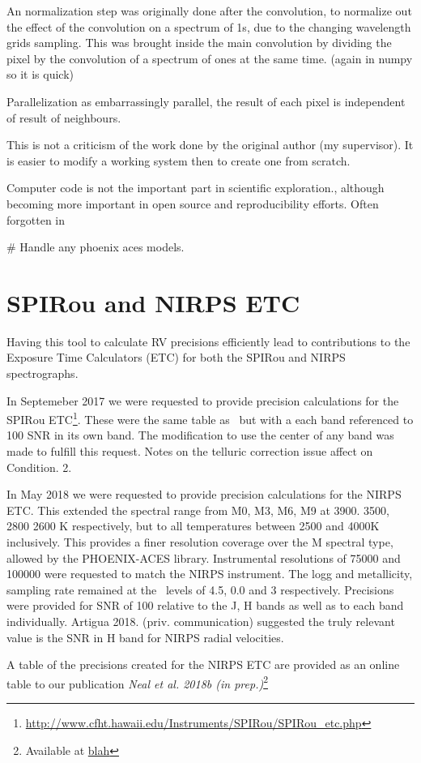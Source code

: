 An normalization step was originally done after the convolution, to normalize out the effect of the convolution on a spectrum of 1s, due to the changing wavelength grids sampling. This was brought inside the main convolution by dividing the pixel by the convolution of a spectrum of ones at the same time. (again in numpy so it is quick)

Parallelization as embarrassingly parallel, the result of each pixel is independent of result of neighbours.

This is not a criticism of the work done by the original author (my supervisor). It is easier to modify a working system then to create one from scratch.

Computer code is not the important part in scientific exploration., although becoming more important in open source and reproducibility efforts. Often forgotten in

\# Handle any phoenix aces models.


\section{SPIRou and NIRPS ETC}
Having this tool to calculate RV precisions efficiently lead to contributions to the Exposure Time Calculators (ETC) for both the SPIRou and NIRPS spectrographs.

In Septemeber 2017 we were requested to provide precision calculations for the SPIRou ETC\footnote{\url{http://www.cfht.hawaii.edu/Instruments/SPIRou/SPIRou_etc.php}}. These were the same table as~\citet{figueira_radial_2016} but with a each band referenced to 100 SNR in its own band. The modification to use the center of any band was made to fulfill this request. Notes on the telluric correction issue affect on Condition. 2.

In May 2018 we were requested to provide precision calculations for the NIRPS ETC. This extended the spectral range from M0, M3, M6, M9 at 3900. 3500, 2800 2600 K respectively, but to all temperatures between 2500 and 4000K inclusively. This provides a finer resolution coverage over the M spectral type, allowed by the PHOENIX-ACES library.
Instrumental resolutions of 75000 and 100000 were requested to match the NIRPS instrument.
The logg and metallicity, sampling rate remained at the~\citet{figueira_radial_2016} levels of 4.5, 0.0 and 3 respectively.
Precisions were provided for SNR of 100 relative to the J, H bands as well as to each band individually. Artigua 2018. (priv. communication) suggested the truly relevant value is the SNR in H band for NIRPS radial velocities.

A table of the precisions created for the NIRPS ETC are provided as an online table to our publication \textit{Neal et al. 2018b (in prep.)}\footnote{Available at \href{blah}{blah}} 

